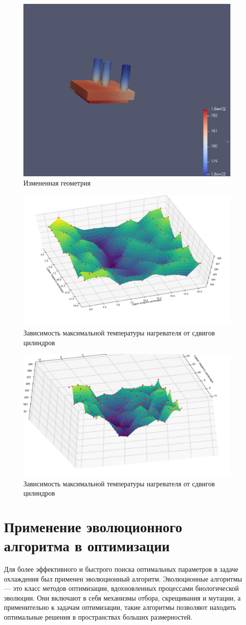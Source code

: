 \documentclass[a4paper,12pt]{article}
\theoremstyle{plain} %
\theoremstyle{definition} %
\theoremstyle{remark} %
\begin{document}
\begin{figure}[h]
	\begin{center}
		\includegraphics[width=0.4\linewidth]{23.1.jpg}
		\caption{Измененная геометрия} %
	\end{center}
\end{figure}
\begin{figure}[h]
	\begin{center}
		\includegraphics[width=0.4\linewidth]{23.2.jpg}
		\caption{Зависимость максимальной температуры нагревателя от сдвигов цилиндров} %
	\end{center}
\end{figure}
\begin{figure}[h]
	\begin{center}
		\includegraphics[width=0.4\linewidth]{23.3.jpg}
		\caption{Зависимость максимальной температуры нагревателя от сдвигов цилиндров} %
	\end{center}
\end{figure}

\section{Применение эволюционного алгоритма в оптимизации}

Для более эффективного и быстрого поиска оптимальных параметров в задаче охлаждения был применен эволюционный алгоритм. Эволюционные алгоритмы — это класс методов оптимизации, вдохновленных процессами биологической эволюции. Они включают в себя механизмы отбора, скрещивания и мутации, а применительно к задачам оптимизации, такие алгоритмы позволяют находить оптимальные решения в пространствах больших размерностей.
\end{document}

